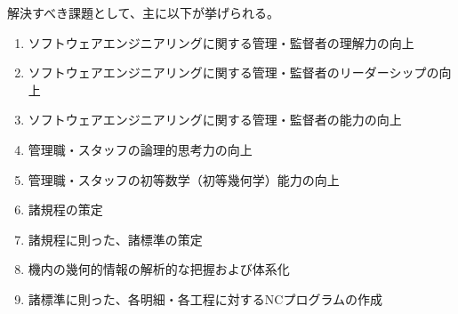 解決すべき課題として、主に以下が挙げられる。
\begin{enumerate}[label=\sarrow]
\item[{\sarrow[red]}] ソフトウェアエンジニアリングに関する管理・監督者の理解力の向上
\item[{\sarrow[red]}] ソフトウェアエンジニアリングに関する管理・監督者のリーダーシップの向上
\item[{\sarrow[red]}] ソフトウェアエンジニアリングに関する管理・監督者の能力の向上
\item[{\sarrow[red]}] 管理職・スタッフの論理的思考力の向上
\item[{\sarrow[red]}] 管理職・スタッフの初等数学（初等幾何学）能力の向上
\item 諸規程の策定
\item 諸規程に則った、諸標準の策定
\item 機内の幾何的情報の解析的な把握および体系化
\item 諸標準に則った、各明細・各工程に対するNCプログラムの作成
\end{enumerate}

